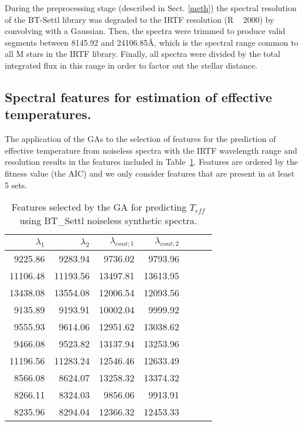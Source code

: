 
During the preprocessing stage (described in Sect. \ref{meth}) the
spectral resolution of the BT-Settl library was degraded to the IRTF
resolution (R ~ 2000) by convolving with a Gaussian. Then, the spectra
were trimmed to produce valid segments between 8145.92 and
24106.85{\AA}, which is the spectral range common to all M stars in
the IRTF library. Finally, all spectra were divided by the total
integrated flux in this range in order to factor out the stellar
distance.

\subsection{Spectral features for estimation of effective temperatures.}

The application of the GAs to the selection of features for the
prediction of effective temperature from noiseless spectra with the
IRTF wavelength range and resolution results in the features included
in Table~\ref{tab:tab_NC_T}. Features are ordered by the fitness value
(the AIC) and we only consider features that are present in at least 5
sets.


%
% 
\begin{table}
\begin{center}
\begin{tabular}{rrrrrrr}
  \hline
  $\lambda_1$ & $\lambda_2$ & $\lambda_{cont;1}$ & $\lambda_{cont;2} $ \\ 
  \hline
9225.86  & 9283.94   & 9736.02  & 9793.96 \\
11106.48 & 11193.56  & 13497.81 & 13613.95 \\
13438.08 & 13554.08  & 12006.54 & 12093.56 \\
9135.89  & 9193.91   & 10002.04 & 9999.92 \\
9555.93  & 9614.06   & 12951.62 & 13038.62 \\
9466.08  & 9523.82   & 13137.94 & 13253.96 \\
11196.56 & 11283.24  & 12546.46 & 12633.49 \\
8566.08  & 8624.07   & 13258.32 & 13374.32 \\
8266.11  & 8324.03   & 9856.06  & 9913.91 \\
8235.96  & 8294.04   & 12366.32 & 12453.33 \\
\hline
\end{tabular}
\caption {Features selected by the GA for predicting $T_{eff}$ 
      using BT\_Settl noiseless synthetic
      spectra. } \label{tab:tab_NC_T}
\end{center}
\end{table}

